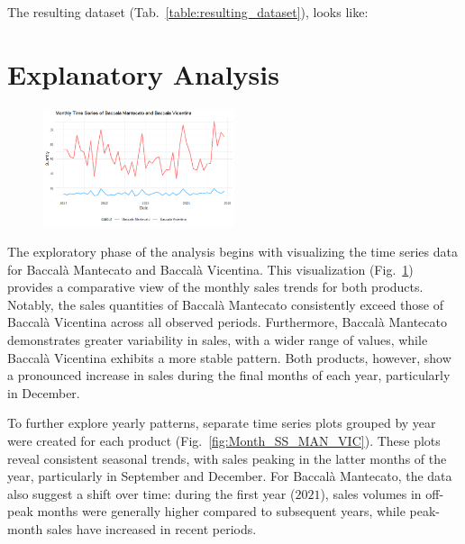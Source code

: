 \documentclass[10pt,twocolumn,letterpaper]{article}
\begin{document}
The resulting dataset (Tab.~\ref{table:resulting_dataset}), looks like:
\begin{table}[h!]
\centering
{}
\caption{Resulting dataset}
\label{table:resulting_dataset}
\end{table}

\section{Explanatory Analysis}

\begin{figure}[h!]
    \centering
    \includegraphics[width=0.5\textwidth]{PlotsBEFD/SS_MAN_VIC.png} 
    \caption{}
    \label{fig:SS_MAN_VIC}
\end{figure}

The exploratory phase of the analysis begins with visualizing the time series data for Baccalà Mantecato and Baccalà Vicentina. This visualization (Fig.~\ref{fig:SS_MAN_VIC}) provides a comparative view of the monthly sales trends for both products. Notably, the sales quantities of Baccalà Mantecato consistently exceed those of Baccalà Vicentina across all observed periods. Furthermore, Baccalà Mantecato demonstrates greater variability in sales, with a wider range of values, while Baccalà Vicentina exhibits a more stable pattern. Both products, however, show a pronounced increase in sales during the final months of each year, particularly in December.

To further explore yearly patterns, separate time series plots grouped by year were created for each product (Fig.~\ref{fig:Month_SS_MAN_VIC}). These plots reveal consistent seasonal trends, with sales peaking in the latter months of the year, particularly in September and December. For Baccalà Mantecato, the data also suggest a shift over time: during the first year ($2021$), sales volumes in off-peak months were generally higher compared to subsequent years, while peak-month sales have increased in recent periods.
\end{document}
